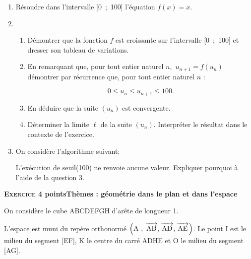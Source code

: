 \documentclass[10pt,a4paper]{article}
\newcommand{\vect}[1]{\overrightarrow{\,\mathstrut#1\,}}
\begin{document}
\begin{enumerate}[resume]
\item Résoudre dans l'intervalle [0~;~100] l'équation $f(x) = x$.
\item
	\begin{enumerate}
		\item Démontrer que la fonction $f$ est croissante sur l'intervalle [0~;~100] et dresser son tableau de variations.
		\item En remarquant que, pour tout entier naturel $n$,\, $u_{n+1} = f\left(u_n\right)$ démontrer par récurrence que, pour tout entier naturel $n$ :

\[0 \leqslant u_n \leqslant u_{n+1} \leqslant 100.\]

		\item En déduire que la suite $\left(u_n\right)$ est convergente.
		\item Déterminer la limite $\ell$ de la suite $\left(u_n\right)$. Interpréter le résultat dans le contexte de l'exercice.
	\end{enumerate}
\item On considère l'algorithme suivant:

\begin{center}
\end{center}

L'exécution de seuil(100) ne renvoie aucune valeur. Expliquer pourquoi à l'aide de la question 3.
\end{enumerate}

\bigskip

\textbf{\textsc{Exercice 4}  points\hfill Thèmes : géométrie dans le plan et dans l'espace}

\medskip

On considère le cube ABCDEFGH d'arête de longueur 1.

L'espace est muni du repère orthonormé $\left(\text{A}~;\, \vect{\text{AB}}, \vect{\text{AD}}, \vect{\text{AE}}\right)$. Le point I est le milieu du
segment [EF], K le centre du carré ADHE et O le milieu du segment [AG].
\end{document}
